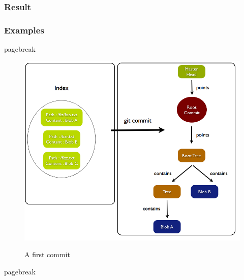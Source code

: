 \subsubsection{Result}

\subsubsection{Examples}


pagebreak
\pagebreak

\begin{figure}[h] 
	\caption{A first commit}
	\centering
	\includegraphics[scale=0.4]{images/commit1.png}
	\label{fig:commit1}
\end{figure}

pagebreak
\pagebreak



